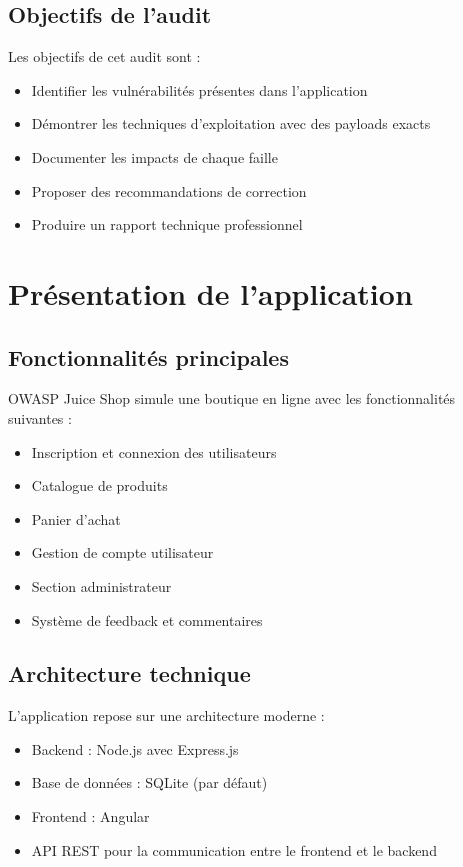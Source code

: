 \documentclass[12pt,a4paper]{report}
\begin{document}
\section{Objectifs de l'audit}
Les objectifs de cet audit sont :
\begin{itemize}
    \item Identifier les vulnérabilités présentes dans l'application
    \item Démontrer les techniques d'exploitation avec des payloads exacts
    \item Documenter les impacts de chaque faille
    \item Proposer des recommandations de correction
    \item Produire un rapport technique professionnel
\end{itemize}

\chapter{Présentation de l'application}

\section{Fonctionnalités principales}
OWASP Juice Shop simule une boutique en ligne avec les fonctionnalités suivantes :
\begin{itemize}
    \item Inscription et connexion des utilisateurs
    \item Catalogue de produits
    \item Panier d'achat
    \item Gestion de compte utilisateur
    \item Section administrateur
    \item Système de feedback et commentaires
\end{itemize}

\section{Architecture technique}
L'application repose sur une architecture moderne :
\begin{itemize}
    \item Backend : Node.js avec Express.js
    \item Base de données : SQLite (par défaut)
    \item Frontend : Angular
    \item API REST pour la communication entre le frontend et le backend
\end{itemize}
\end{document}
